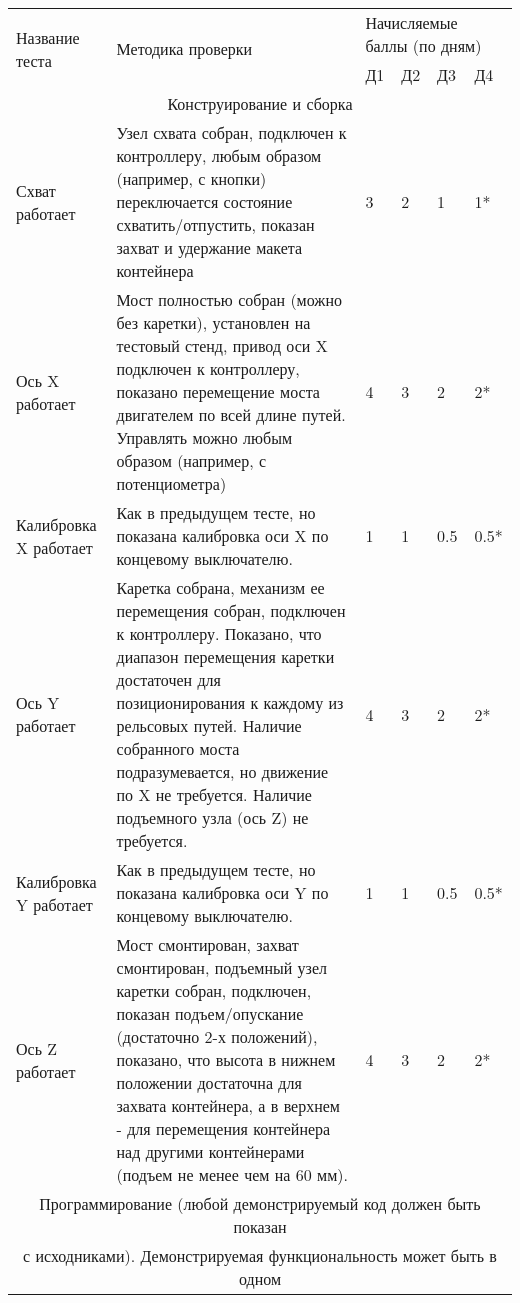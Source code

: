 \begin{center}
    \small
    \begin{longtable}{|p{2.8cm}|p{6.2cm}|p{1.1cm}|p{1.1cm}|p{1.1cm}|p{1.1cm}|}
        \hline
        \multirow{2}{*}{Название теста} & \multirow{2}{*}{Методика проверки} & \multicolumn{4}{l|}{Начисляемые баллы (по дням)} \\ 
        \cline{3-6} 
        &  & Д1 & Д2 & Д3 & Д4 \\ 
        \hline
        \multicolumn{6}{|c|}{Конструирование и сборка} \\
        \hline
        Схват работает &	Узел схвата собран, подключен к контроллеру, любым образом (например, с кнопки) переключается состояние схватить/отпустить, показан захват и удержание макета контейнера & 3 & 2 & 1 & 1* \\
        \hline
        Ось X работает & Мост полностью собран (можно без каретки), установлен на тестовый стенд, привод оси X подключен к контроллеру, показано перемещение моста двигателем по всей длине путей. Управлять можно любым образом (например, с потенциометра) &4 &3 &2 &2*\\
        \hline
        Калибровка X работает&	Как в предыдущем тесте, но показана калибровка оси X по концевому выключателю. &1 &1 &0.5 &0.5*\\
        \hline
        Ось Y работает &	Каретка собрана, механизм ее перемещения собран, подключен к контроллеру. Показано, что диапазон перемещения каретки достаточен для позиционирования к каждому из рельсовых путей. Наличие собранного моста подразумевается, но движение по X не требуется.  Наличие подъемного узла (ось Z) не требуется. & 4 & 3 & 2 & 2* \\
        \hline
        Калибровка Y работает &Как в предыдущем тесте, но показана калибровка оси Y по концевому выключателю. &1 &1 &0.5 &0.5* \\
        \hline
        Ось Z работает & Мост смонтирован, захват смонтирован, подъемный узел каретки собран, подключен, показан подъем/опускание (достаточно 2-х положений), показано, что высота в нижнем положении достаточна для захвата контейнера, а в верхнем - для перемещения контейнера над другими контейнерами (подъем не менее чем на 60 мм). &	4 &3 &2 &2* \\
        \hline
        \multicolumn{6}{|c|}{Программирование (любой демонстрируемый код должен быть показан}\\
        \multicolumn{6}{|c|}{с исходниками). Демонстрируемая функциональность может быть в одном} \\

\end{longtable}
\end{center}

